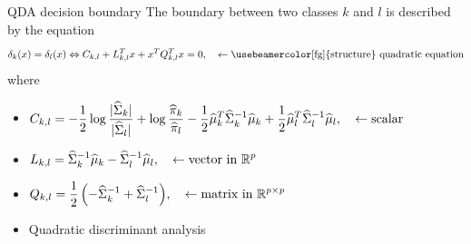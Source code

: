 \documentclass[compress, smaller, serif, 9pt]{beamer}
\newcommand{\structuretext}[1]{{\usebeamercolor[fg]{structure} #1}}
\newcommand{\doigt}{\structuretext{\noindent \Pisymbol{pzd}{43}}}
\begin{document}
\begin{frame}{QDA decision boundary}
The boundary between two classes $k$ and $l$ is described by the equation
\begin{align*}
\delta_k(x)= \delta_l(x)  \Leftrightarrow C_{k,l} + L_{k,l}^T x + x^T  Q_{k,l}^T x= 0, \quad \leftarrow \textrm{\structuretext{quadratic} equation}
\end{align*}
where
\begin{itemize}
 \item $\begin{displaystyle}
        C_{k,l}= { -\frac{1}{2} \log \frac{|\widehat{\Sigma}_k|}{ |\widehat{\Sigma}_l|} + \log \frac{\widehat{\pi}_k}{\widehat{\pi}_l}
        - \frac{1}{2} {\widehat{\mu}_k}^T \widehat{\Sigma}_k^{-1} \widehat{\mu}_k + \frac{1}{2}
 {\widehat{\mu}_l}^T \widehat{\Sigma}_l^{-1} \widehat{\mu}_l},
       \end{displaystyle} \quad \leftarrow \textrm{scalar}$
 \item $\begin{displaystyle}
          L_{k,l}= { \widehat{\Sigma}_k^{-1} \widehat{\mu}_k - \widehat{\Sigma}_l^{-1} \widehat{\mu}_l},
        \end{displaystyle}\quad \leftarrow \textrm{vector in } \mathbb{R}^p$
\item $\begin{displaystyle}
          Q_{k,l}= { \frac{1}{2} \left( -\widehat{\Sigma}_k^{-1} + \widehat{\Sigma}_l^{-1} \right)},
        \end{displaystyle}\quad \leftarrow \textrm{matrix in } \mathbb{R}^{p \times p}$
\end{itemize}

\begin{itemize}
 \item[\doigt] \structuretext{Quadratic discriminant analysis}
\end{itemize}


\end{frame}



\end{document}
